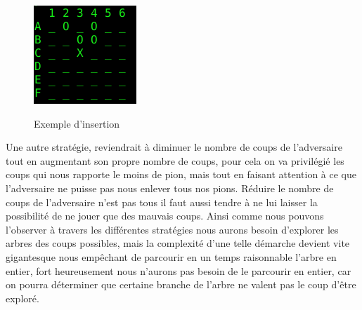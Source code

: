 \documentclass[10pt, a4paper]{article}
\begin{document}
\begin {figure}[H]
  \centering
  \includegraphics [scale = 0.5]{images/Insertion.png}
  \label {exemple_insertion}
  \caption {Exemple d'insertion}
\end {figure}

Une autre stratégie, reviendrait à diminuer le nombre de coups de l'adversaire tout en augmentant son propre nombre de coups, pour cela on va privilégié les coups qui nous rapporte le moins de pion, mais tout en faisant attention à ce que l'adversaire ne puisse pas nous enlever tous nos pions. Réduire le nombre de coups de l'adversaire n'est pas tous il faut aussi tendre à ne lui laisser la possibilité de ne jouer que des mauvais coups.\newline
Ainsi comme nous pouvons l'observer à travers les différentes stratégies nous aurons besoin d'explorer les arbres des coups possibles, mais la complexité d'une telle démarche devient vite gigantesque nous empêchant de parcourir en un temps raisonnable l'arbre en entier, fort heureusement nous n'aurons pas besoin de le parcourir en entier, car on pourra déterminer que certaine branche de l'arbre ne valent pas le coup d'être exploré.
\end{document}
